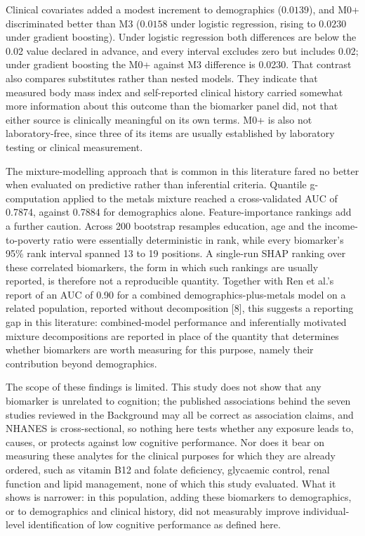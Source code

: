 \documentclass[12pt]{article}
\begin{document}
Clinical covariates added a modest increment to demographics ($0.0139$), and M0+ discriminated better than M3 ($0.0158$ under logistic regression, rising to $0.0230$ under gradient boosting). Under logistic regression both differences are below the 0.02 value declared in advance, and every interval excludes zero but includes 0.02; under gradient boosting the M0+ against M3 difference is 0.0230. That contrast also compares substitutes rather than nested models. They indicate that measured body mass index and self-reported clinical history carried somewhat more information about this outcome than the biomarker panel did, not that either source is clinically meaningful on its own terms. M0+ is also not laboratory-free, since three of its items are usually established by laboratory testing or clinical measurement.

The mixture-modelling approach that is common in this literature fared no better when evaluated on predictive rather than inferential criteria. Quantile g-computation applied to the metals mixture reached a cross-validated AUC of 0.7874, against 0.7884 for demographics alone. Feature-importance rankings add a further caution. Across 200 bootstrap resamples education, age and the income-to-poverty ratio were essentially deterministic in rank, while every biomarker's 95\% rank interval spanned 13 to 19 positions. A single-run SHAP ranking over these correlated biomarkers, the form in which such rankings are usually reported, is therefore not a reproducible quantity. Together with Ren et al.'s report of an AUC of 0.90 for a combined demographics-plus-metals model on a related population, reported without decomposition [8], this suggests a reporting gap in this literature: combined-model performance and inferentially motivated mixture decompositions are reported in place of the quantity that determines whether biomarkers are worth measuring for this purpose, namely their contribution beyond demographics.

The scope of these findings is limited. This study does not show that any biomarker is unrelated to cognition; the published associations behind the seven studies reviewed in the Background may all be correct as association claims, and NHANES is cross-sectional, so nothing here tests whether any exposure leads to, causes, or protects against low cognitive performance. Nor does it bear on measuring these analytes for the clinical purposes for which they are already ordered, such as vitamin B12 and folate deficiency, glycaemic control, renal function and lipid management, none of which this study evaluated. What it shows is narrower: in this population, adding these biomarkers to demographics, or to demographics and clinical history, did not measurably improve individual-level identification of low cognitive performance as defined here.
\end{document}

